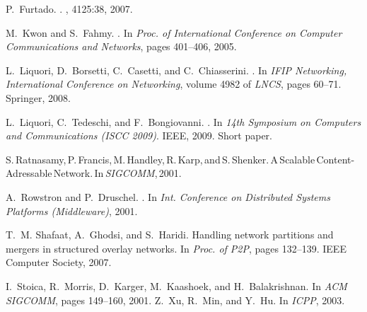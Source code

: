 \documentclass{llncs}
\begin{document}
\begin{thebibliography}{10}
{
P.~Furtado.
.
, 4125:38, 2007.

M.~Kwon and S.~Fahmy.
.
\newblock In {\em Proc. of International Conference on Computer Communications
  and Networks}, pages 401--406, 2005.

L.~Liquori, D.~Borsetti, C.~Casetti, and C.~Chiasserini.
.
\newblock In {\em IFIP Networking, International Conference on Networking},
  volume 4982 of {\em LNCS}, pages 60--71. Springer, 2008.

L.~Liquori, C.~Tedeschi, and F.~Bongiovanni.
.
\newblock In {\em 14th Symposium on Computers and Communications (ISCC 2009)}.
  IEEE, 2009.
\newblock Short paper.

\mbox{S.\,Ratnasamy,\,P.\,Francis,\,M.\,Handley,\,R.\,Karp,\,and\,S.\,Shenker.\,{A\,Scalable\,Content{-}Adressable\,Network}.\,In\,{\em SIGCOMM},\,2001.}

A.~Rowstron and P.~Druschel.
.
\newblock In {\em Int. Conference on Distributed Systems Platforms
  (Middleware)}, 2001.

T.~M. Shafaat, A.~Ghodsi, and S.~Haridi.
\newblock Handling network partitions and mergers in structured overlay
  networks.
\newblock In {\em Proc. of P2P}, pages 132--139. IEEE Computer Society, 2007.


I.~Stoica, R.~Morris, D.~Karger, M.~Kaashoek, and H.~Balakrishnan.
\newblock In {\em ACM SIGCOMM}, pages 149--160, 2001.
 Z.~Xu, R.~Min, and Y.~Hu.    \newblock In {\em
    ICPP}, 2003.  
%
}
\end{thebibliography}
\end{document}
